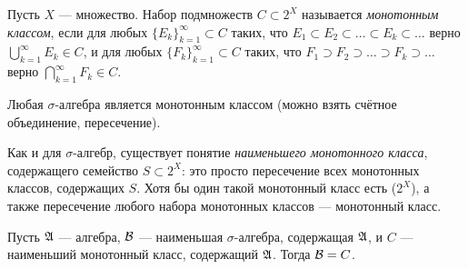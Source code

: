 \begin{df}
 Пусть $X$  --- множество. Набор подмножеств $C \subset 2^{X}$ называется \textit{монотонным классом}, если для любых $\{E_{k}\}_{k=1}^{\infty} \subset C $ таких, что $ E_1 \subset E_2 \subset \ldots \subset E_k \subset \ldots $ верно $\bigcup_{k=1}^{\infty} E_k \in C$, и для любых $\{F_{k}\}_{k=1}^{\infty} \subset C $  таких, что $ F_1 \supset F_2 \supset \ldots \supset F_k \supset \ldots $ верно $\bigcap_{k=1}^{\infty} F_k \in C$.
\end{df}
\begin{exmpl*}
 Любая $\sigma$-алгебра является монотонным классом (можно взять счётное объединение, пересечение).
\end{exmpl*}
\begin{remrk}
  Как и для $\sigma$-алгебр, существует понятие \textit{наименьшего монотонного класса}, содержащего семейство $S \subset 2^{X}$: это просто пересечение всех монотонных классов, содержащих $S$. Хотя бы один такой монотонный класс есть ($2^{X}$), а также пересечение любого набора монотонных классов --- монотонный класс.
\end{remrk}
\begin{lm}
\label{lemma:about_monotonous_class}
 
Пусть $\mathfrak{A}$ --- алгебра, $\mathcal{B}$ --- наименьшая $\sigma$-алгебра, содержащая $\mathfrak{A}$, и $C$ --- наименьший монотонный класс, содержащий $\mathfrak{A}$. Тогда $\mathcal{B} = C$.
\end{lm}
